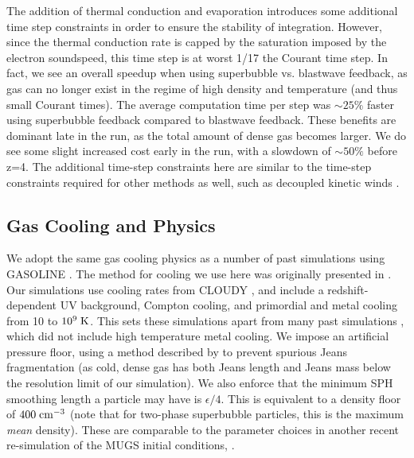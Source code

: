 The addition of thermal conduction and evaporation introduces some additional
time step constraints in order to ensure the stability of integration.  However,
since the thermal conduction rate is capped by the saturation imposed by the
electron soundspeed, this time step is at worst 1/17 the Courant time step. In
fact, we see an overall speedup when using superbubble vs. blastwave feedback,
as gas can no longer exist in the regime of high density and temperature (and
thus small Courant times).  The average computation time per step was $\sim
25\%$ faster using superbubble feedback compared to blastwave feedback.  These
benefits are dominant late in the run, as the total amount of dense gas becomes
larger. We do see some slight increased cost early in the run, with a slowdown
of $\sim50\%$ before z=4.  The additional time-step constraints here are similar
to the time-step constraints required for other methods as well, such as
decoupled kinetic winds \citep{Springel2003}.


\subsection{Gas Cooling and Physics}
We adopt the same gas cooling physics as a number of past simulations using
\textsc{GASOLINE} \citep{Stinson2013,Keller2014}.  The method for cooling we use
here was originally presented in \citet{Shen2010}.  Our simulations use cooling
rates from \textsc{CLOUDY} \citep{Ferland2013}, and  include a
redshift-dependent UV background, Compton cooling, and primordial and metal
cooling from 10 to $10^9\; \rm{K}$.  This sets these simulations apart from many
past simulations \citep{Governato2009,Brook2011,Guedes2011}, which did not
include high temperature metal cooling.  We impose an artificial pressure floor,
using a method described by \citet{Robertson2008} to prevent spurious Jeans
fragmentation (as cold, dense gas has both Jeans length and Jeans mass below the
resolution limit of our simulation).  We also enforce that the minimum SPH
smoothing length a particle may have is $\epsilon/4$.  This is equivalent to a
density floor of $400\; \rm{cm^{-3}}$ (note that for two-phase superbubble
particles, this is the maximum \textit{mean} density).  These are comparable to
the parameter choices in another recent re-simulation of the MUGS initial
conditions, \citet{Stinson2013}.

